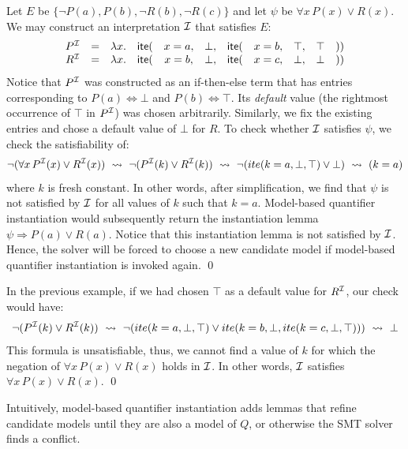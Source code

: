 \documentclass[oribibl]{llncs}
\begin{document}
\begin{example}
Let $E$ be $\{ \neg P( a ), P( b ), \neg R( b ), \neg R( c ) \}$ and let $\psi$ be $\forall x\, P( x ) \vee R( x )$.
We may construct an interpretation $\mathcal{I}$ that satisfies $E$:
\[
\begin{array}{rcccccccccc}
P^{\mathcal{I}} & = & \lambda x. & \mathsf{ite}( & x=a, & \bot, & \mathsf{ite}( & x=b, & \top, & \top  & )) \\
R^{\mathcal{I}} & = & \lambda x. & \mathsf{ite}( & x=b, & \bot, & \mathsf{ite}( & x=c, & \bot, & \bot  & )) \\
\end{array}
\]
Notice that $P^{\mathcal{I}}$ was constructed as an if-then-else term that has entries corresponding to $P( a ) \Leftrightarrow \bot$
and $P( b ) \Leftrightarrow \top$. Its \emph{default} value (the rightmost occurrence of $\top$ in $P^{\mathcal{I}}$) was chosen arbitrarily.
Similarly, we fix the existing entries and chose a default value of $\bot$ for $R$.
To check whether $\mathcal{I}$ satisfies $\psi$, we check the satisfiability of:
\[
\neg ( \forall x\, P^{\mathcal{I}}( x ) \vee R^{\mathcal{I}}( x ) ) \ \leadsto \  \neg ( P^{\mathcal{I}}( k ) \vee R^{\mathcal{I}}( k ) ) \ \leadsto \  \neg ( ite( k=a, \bot, \top) \vee \bot ) \ \leadsto \  ( k = a )
\]
where $k$ is fresh constant.
In other words, after simplification, we find that $\psi$ is not satisfied by $\mathcal{I}$ for all values of $k$ such that $k = a$.
Model-based quantifier instantiation would subsequently return the instantiation lemma $\psi \Rightarrow P( a ) \vee R( a )$.
Notice that this instantiation lemma is not satisfied by $\mathcal{I}$.
Hence, the solver will be forced to choose a new candidate model 
if model-based quantifier instantiation is invoked again.
\qed
\end{example}
\begin{example}
In the previous example, if we had chosen $\top$ as a default value for $R^{\mathcal{I}}$, our check would have:
\[
\neg ( P^{\mathcal{I}}( k ) \vee R^{\mathcal{I}}( k ) ) \ \leadsto \  \neg ( ite( k=a, \bot, \top) \vee ite( k=b, \bot, ite( k=c, \bot, \top)) ) \ \leadsto \  \bot
\]
This formula is unsatisfiable, thus, we cannot find a value of $k$ for which the negation of $\forall x\, P( x ) \vee R( x )$ holds in $\mathcal{I}$.
In other words, $\mathcal{I}$ satisfies $\forall x\, P( x ) \vee R( x )$.
\qed
\end{example}
Intuitively,
model-based quantifier instantiation adds lemmas that refine candidate models
until they are also a model of $Q$, or otherwise the SMT solver finds a conflict.
\end{document}
